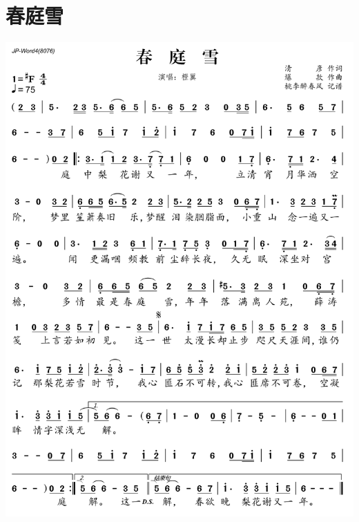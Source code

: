 \documentclass[cn,pad,twocol]{elegantbook}
\begin{document}
\section{春庭雪}\includegraphics[width=\textwidth]{rpi400/20210124-春庭雪.png}
\end{document}
